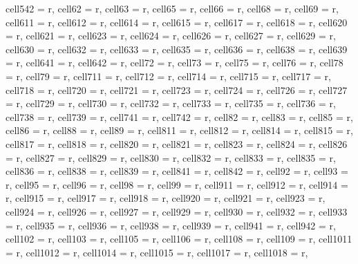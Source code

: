 \begin{table}
{\begin{tblr}
{  cell{5}{42} = {r},
  cell{6}{2} = {r},
  cell{6}{3} = {r},
  cell{6}{5} = {r},
  cell{6}{6} = {r},
  cell{6}{8} = {r},
  cell{6}{9} = {r},
  cell{6}{11} = {r},
  cell{6}{12} = {r},
  cell{6}{14} = {r},
  cell{6}{15} = {r},
  cell{6}{17} = {r},
  cell{6}{18} = {r},
  cell{6}{20} = {r},
  cell{6}{21} = {r},
  cell{6}{23} = {r},
  cell{6}{24} = {r},
  cell{6}{26} = {r},
  cell{6}{27} = {r},
  cell{6}{29} = {r},
  cell{6}{30} = {r},
  cell{6}{32} = {r},
  cell{6}{33} = {r},
  cell{6}{35} = {r},
  cell{6}{36} = {r},
  cell{6}{38} = {r},
  cell{6}{39} = {r},
  cell{6}{41} = {r},
  cell{6}{42} = {r},
  cell{7}{2} = {r},
  cell{7}{3} = {r},
  cell{7}{5} = {r},
  cell{7}{6} = {r},
  cell{7}{8} = {r},
  cell{7}{9} = {r},
  cell{7}{11} = {r},
  cell{7}{12} = {r},
  cell{7}{14} = {r},
  cell{7}{15} = {r},
  cell{7}{17} = {r},
  cell{7}{18} = {r},
  cell{7}{20} = {r},
  cell{7}{21} = {r},
  cell{7}{23} = {r},
  cell{7}{24} = {r},
  cell{7}{26} = {r},
  cell{7}{27} = {r},
  cell{7}{29} = {r},
  cell{7}{30} = {r},
  cell{7}{32} = {r},
  cell{7}{33} = {r},
  cell{7}{35} = {r},
  cell{7}{36} = {r},
  cell{7}{38} = {r},
  cell{7}{39} = {r},
  cell{7}{41} = {r},
  cell{7}{42} = {r},
  cell{8}{2} = {r},
  cell{8}{3} = {r},
  cell{8}{5} = {r},
  cell{8}{6} = {r},
  cell{8}{8} = {r},
  cell{8}{9} = {r},
  cell{8}{11} = {r},
  cell{8}{12} = {r},
  cell{8}{14} = {r},
  cell{8}{15} = {r},
  cell{8}{17} = {r},
  cell{8}{18} = {r},
  cell{8}{20} = {r},
  cell{8}{21} = {r},
  cell{8}{23} = {r},
  cell{8}{24} = {r},
  cell{8}{26} = {r},
  cell{8}{27} = {r},
  cell{8}{29} = {r},
  cell{8}{30} = {r},
  cell{8}{32} = {r},
  cell{8}{33} = {r},
  cell{8}{35} = {r},
  cell{8}{36} = {r},
  cell{8}{38} = {r},
  cell{8}{39} = {r},
  cell{8}{41} = {r},
  cell{8}{42} = {r},
  cell{9}{2} = {r},
  cell{9}{3} = {r},
  cell{9}{5} = {r},
  cell{9}{6} = {r},
  cell{9}{8} = {r},
  cell{9}{9} = {r},
  cell{9}{11} = {r},
  cell{9}{12} = {r},
  cell{9}{14} = {r},
  cell{9}{15} = {r},
  cell{9}{17} = {r},
  cell{9}{18} = {r},
  cell{9}{20} = {r},
  cell{9}{21} = {r},
  cell{9}{23} = {r},
  cell{9}{24} = {r},
  cell{9}{26} = {r},
  cell{9}{27} = {r},
  cell{9}{29} = {r},
  cell{9}{30} = {r},
  cell{9}{32} = {r},
  cell{9}{33} = {r},
  cell{9}{35} = {r},
  cell{9}{36} = {r},
  cell{9}{38} = {r},
  cell{9}{39} = {r},
  cell{9}{41} = {r},
  cell{9}{42} = {r},
  cell{10}{2} = {r},
  cell{10}{3} = {r},
  cell{10}{5} = {r},
  cell{10}{6} = {r},
  cell{10}{8} = {r},
  cell{10}{9} = {r},
  cell{10}{11} = {r},
  cell{10}{12} = {r},
  cell{10}{14} = {r},
  cell{10}{15} = {r},
  cell{10}{17} = {r},
  cell{10}{18} = {r},
}
\end{tblr}}
\end{table}
